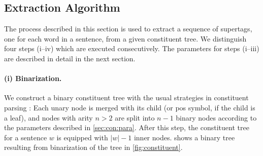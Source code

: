 \documentclass[../../document.tex]{subfiles}
\begin{document}
    \subsection{Extraction Algorithm}
    The process described in this section is used to extract a sequence of supertags, one for each word in a sentence, from a given constituent tree.
    We distinguish four steps (i--iv) which are executed consecutively.
    The parameters for steps (i--iii) are described in detail in the next section.


    \paragraph{(i) Binarization.}
    We construct a binary constituent tree with the usual strategies in constituent parsing \cite{KalMai13}:
    Each unary node is merged with its child (or pos symbol, if the child is a leaf), and nodes with arity \(n>2\) are split into \(n-1\) binary nodes according to the parameters described in \cref{sec:con:para}.
    After this step, the constituent tree for a sentence \(w\) is equipped with \(|w|-1\) inner nodes.
     shows a binary tree resulting from binarization of the tree in \cref{fig:constituent}.
\end{document}

